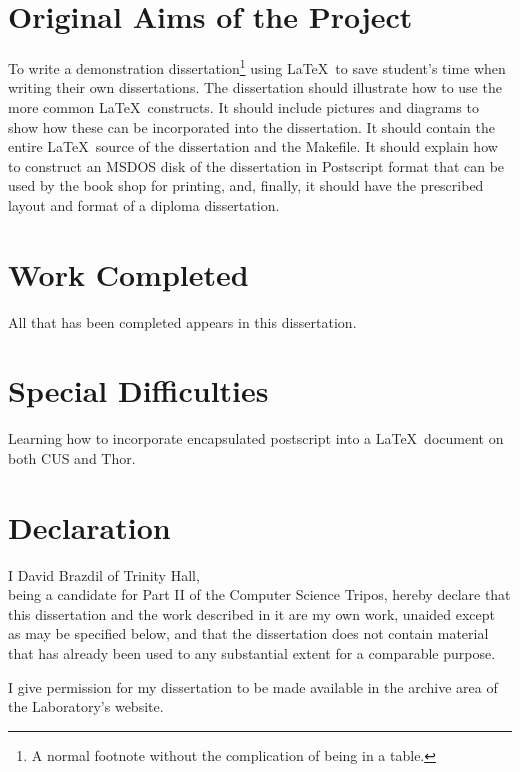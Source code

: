 \documentclass[12pt,twoside,notitlepage]{report}
\begin{document}
\section*{Original Aims of the Project}

To write a demonstration dissertation\footnote{A normal footnote without the
complication of being in a table.} using \LaTeX\ to save
student's time when writing their own dissertations. The dissertation
should illustrate how to use the more common \LaTeX\ constructs. It
should include pictures and diagrams to show how these can be
incorporated into the dissertation.  It should contain the entire
\LaTeX\ source of the dissertation and the Makefile.  It should
explain how to construct an MSDOS disk of the dissertation in
Postscript format that can be used by the book shop for printing, and,
finally, it should have the prescribed layout and format of a diploma
dissertation.


\section*{Work Completed}

All that has been completed appears in this dissertation.

\section*{Special Difficulties}

Learning how to incorporate encapsulated postscript into a \LaTeX\
document on both CUS and Thor.
 
\newpage
\section*{Declaration}

I David Brazdil of Trinity Hall,\\
being a candidate for Part II of the Computer Science Tripos,
hereby declare that this dissertation and the work described in it
are my own work, unaided except as may be specified below, and
that the dissertation does not contain material that has already
been used to any substantial extent for a comparable purpose.

I give permission for my dissertation to be made available in the archive
area of the Laboratory's website.

\bigskip
\medskip
{}

\bigskip
{}
\end{document}
